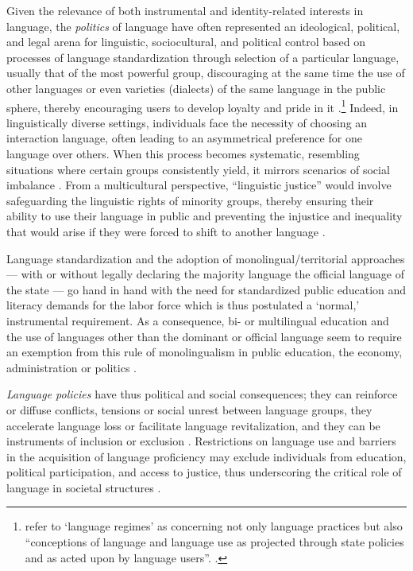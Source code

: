 \documentclass[output=paper,colorlinks,citecolor=brown]{langscibook}
\begin{document}
Given the relevance of both instrumental and identity-related interests in language, the \textit{politics} of language have often represented an ideological, political, and legal arena for linguistic, sociocultural, and political control based on processes of language standardization through selection of a particular language, usually that of the most powerful group, discouraging at the same time the use of other languages or even varieties (dialects) of the same language in the public sphere, thereby encouraging users to develop loyalty and pride in it \citep{marko_constantin2019}.\footnote{\citeauthor{sonntag_cardinal2015} refer to `language regimes' as concerning not only language practices but also ``conceptions of language and language use as projected through state policies and as acted upon by language users''. \citep[6]{sonntag_cardinal2015}.} Indeed, in linguistically diverse settings, individuals face the necessity of choosing an interaction language, often leading to an asymmetrical preference for one language over others. When this process becomes systematic, resembling situations where certain groups consistently yield, it mirrors scenarios of social imbalance \citep{van_parijs2011}. From a multicultural perspective, ``linguistic justice'' would involve safeguarding the linguistic rights of minority groups, thereby ensuring their ability to use their language in public and preventing the injustice and inequality that would arise if they were forced to shift to another language \citep{deschutter2007,van_parijs2011,mowbray2012,alcalde2015,riera-gil2019,gazzola_wickstrom_fettes2023,medda-windischer_constantin2024}.

Language standardization \citep{costa_de_korne_lane2017,zeba2020} and the adoption of monolingual/territorial approaches \citep{barry2001,van_parijs2011} --- with or without legally declaring the majority language the official language of the state --- go hand in hand with the need for standardized public education and literacy demands for the labor force which is thus postulated a `normal,' instrumental requirement. As a consequence, bi- or multilingual education and the use of languages other than the dominant or official language seem to require an exemption from this rule of monolingualism in public education, the economy, administration or politics \citep{marko_constantin2019}. 

\textit{Language policies} have thus political and social consequences; they can reinforce or diffuse conflicts, tensions or social unrest between language groups, they accelerate language loss or facilitate language revitalization, and they can be instruments of inclusion or exclusion \citep{sonntag_cardinal2015}. Restrictions on language use and barriers in the acquisition of language proficiency may exclude individuals from education, political participation, and access to justice, thus underscoring the critical role of language in societal structures \citep{osce_hcnm2017,un2004,skutnabb-kangas2008}. 
\end{document}

